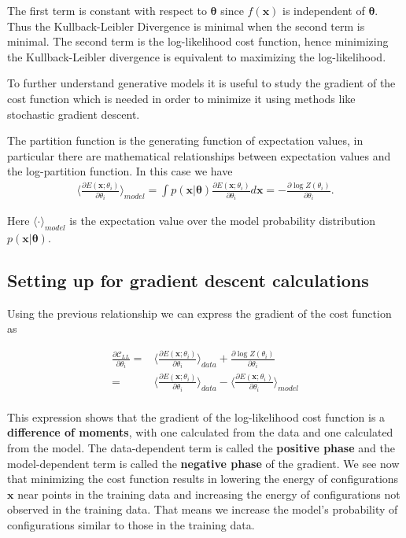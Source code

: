 \documentclass[%
oneside,                 %
final,                   %
10pt]{article}
\begin{document}
The first term is constant with respect to $\bm{\theta}$ since $f(\bm{x})$ is independent of $\bm{\theta}$. Thus the Kullback-Leibler Divergence is minimal when the second term is minimal. The second term is the log-likelihood cost function, hence minimizing the Kullback-Leibler divergence is equivalent to maximizing the log-likelihood.

To further understand generative models it is useful to study the
gradient of the cost function which is needed in order to minimize it
using methods like stochastic gradient descent. 

The partition function is the generating function of
expectation values, in particular there are mathematical relationships
between expectation values and the log-partition function. In this
case we have
\begin{align}
	\langle \frac{ \partial E(\bm{x}; \theta_i) } { \partial \theta_i} \rangle_{model}
	= \int p(\bm{x}| \bm{\theta}) \frac{ \partial E(\bm{x}; \theta_i) } { \partial \theta_i} d\bm{x} 
	= -\frac{\partial \log Z(\theta_i)}{ \partial  \theta_i} .
\end{align}

Here $\langle \cdot \rangle_{model}$ is the expectation value over the model probability distribution $p(\bm{x}| \bm{\theta})$.

\subsection*{Setting up for gradient descent calculations}

Using the previous relationship we can express the gradient of the cost function as

\begin{align}
	\frac{\partial \mathcal{C}_{LL}}{\partial \theta_i}
	=& \langle \frac{ \partial E(\bm{x}; \theta_i) } { \partial \theta_i} \rangle_{data} + \frac{\partial \log Z(\theta_i)}{ \partial  \theta_i} \\
	=& \langle \frac{ \partial E(\bm{x}; \theta_i) } { \partial \theta_i} \rangle_{data} - \langle \frac{ \partial E(\bm{x}; \theta_i) } { \partial \theta_i} \rangle_{model} \\
\end{align}

This expression shows that the gradient of the log-likelihood cost
function is a \textbf{difference of moments}, with one calculated from
the data and one calculated from the model. The data-dependent term is
called the \textbf{positive phase} and the model-dependent term is
called the \textbf{negative phase} of the gradient. We see now that
minimizing the cost function results in lowering the energy of
configurations $\bm{x}$ near points in the training data and
increasing the energy of configurations not observed in the training
data. That means we increase the model's probability of configurations
similar to those in the training data.
\end{document}
